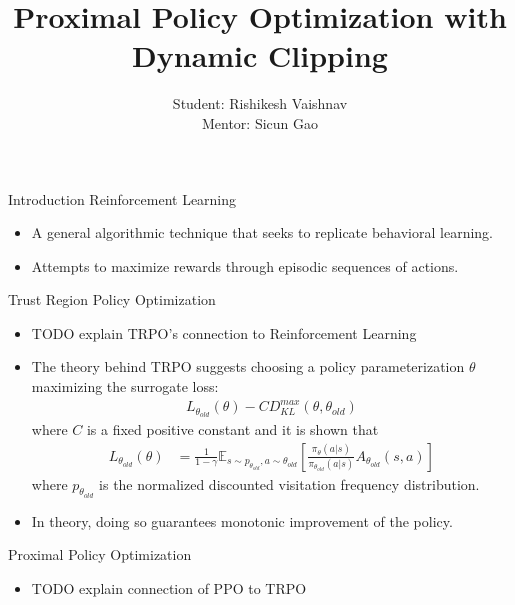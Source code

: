 \documentclass{beamer}
\title{Proximal Policy Optimization with Dynamic Clipping}
\author{Student: Rishikesh Vaishnav\\Mentor: Sicun Gao}
\begin{document}
\maketitle
\begin{frame}{Introduction}
    Reinforcement Learning
    \begin{itemize}
        \item A general algorithmic technique that seeks to replicate behavioral
            learning.
        \item Attempts to maximize rewards through episodic sequences of
            actions.
    \end{itemize}
    \framebreak
    Trust Region Policy Optimization
    \begin{itemize}
        \item TODO explain TRPO's connection to Reinforcement Learning
        \item The theory behind TRPO suggests choosing a policy parameterization
            $\theta$ maximizing the surrogate loss:
            \begin{align*}
                L_{\theta_{old}}(\theta) 
                - CD_{KL}^{max}(\theta, \theta_{old})
            \end{align*}
            where $C$ is a fixed positive constant and it is shown that 
            \begin{align*}
                L_{\theta_{old}}(\theta) &= \frac{1}{1 - \gamma}
                \mathbb{E}_{s \sim p_{\theta_{old}}, a \sim \theta_{old}}
                \left[
                \frac
                {\pi_{\theta}(a | s)}
                {\pi_{\theta_{old}} (a | s)}
                A_{\theta_{old}}(s, a)
                \right]
            \end{align*}
            where $p_{\theta_{old}}$ is the normalized discounted visitation
            frequency distribution.
        \item In theory, doing so guarantees monotonic improvement of the
            policy.
    \end{itemize}
    \framebreak
    Proximal Policy Optimization
    \begin{itemize}
        \item TODO explain connection of PPO to TRPO
    \end{itemize}
\end{frame}
\end{document}
